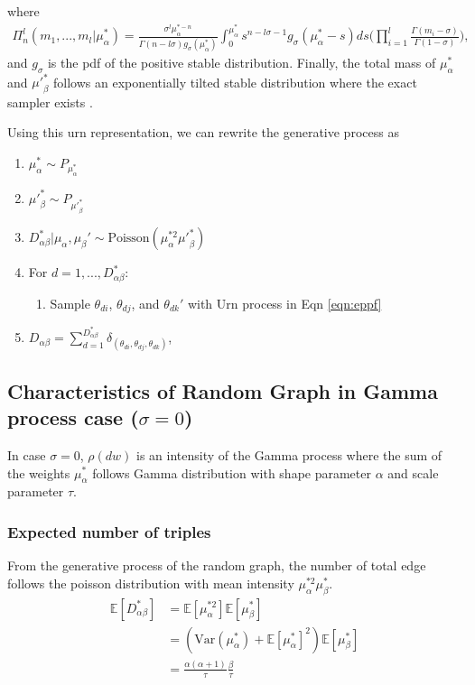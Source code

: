 \documentclass{article}
\begin{document}
where
\begin{align}
\Pi_{n}^l(m_1, ..., m_l|\mu_\alpha^*) = \frac{\sigma^l \mu_\alpha^{*-n}}{\Gamma(n-l\sigma)g_{\sigma}(\mu_\alpha^*)} \int_{0}^{\mu_\alpha^*}s^{n-l\sigma-1}g_{\sigma}(\mu_\alpha^*-s)ds \bigg(\prod_{i=1}^{l} \frac{\Gamma(m_i-\sigma)}{\Gamma(1-\sigma)} \bigg),
\end{align}
and $g_\sigma$ is the pdf of the positive stable distribution.
Finally, the total mass of $\mu_\alpha^*$ and ${\mu'}_\beta^{*}$ follows an exponentially tilted stable distribution where the exact sampler exists \citep{devroye2009random,hofert2011sampling}. 

Using this urn representation, we can rewrite the generative process as
\begin{enumerate}
\item $\mu_\alpha^* \sim P_{\mu_\alpha^*}$
\item ${\mu'}_\beta^{*} \sim P_{{\mu'}_\beta^{*}}$
\item $D_{\alpha\beta}^* | \mu_\alpha, \mu_\beta' \sim \text{Poisson}(\mu_\alpha^{*2}{\mu'}_\beta^{*})$
\item For $d=1,...,D_{\alpha\beta}^*$:
\begin{enumerate}
\item Sample $\theta_{di}$, $\theta_{dj}$, and $\theta_{dk}'$ with Urn process in Eqn \ref{eqn:eppf}
\end{enumerate}
\item $D_{\alpha\beta} = \sum_{d=1}^{D_{\alpha\beta}^*} \delta_{(\theta_{di}, \theta_{dj}, \theta_{dk})}$,
\end{enumerate}

\subsection{Characteristics of Random Graph in Gamma process case ($\sigma=0$)}
In case $\sigma=0$, $\rho(dw)$ is an intensity of the Gamma process where the sum of the weights $\mu_\alpha^*$ follows Gamma distribution with shape parameter $\alpha$ and scale parameter $\tau$.

\subsubsection{Expected number of triples}
From the generative process of the random graph, the number of total edge follows the poisson distribution with mean intensity $\mu^{*2}_\alpha \mu^*_\beta$.
\begin{align}
\mathbb{E}[D^*_{\alpha\beta}] & = \mathbb{E}[\mu^{*2}_\alpha]\mathbb{E}[\mu^*_\beta] \\ 
&= (\text{Var}(\mu^*_\alpha) + \mathbb{E}[\mu^{*}_\alpha]^2)\mathbb{E}[\mu^*_\beta]\\
& = \frac{\alpha(\alpha+1)}{\tau} \frac{\beta}{\tau}
\end{align}
\end{document}
